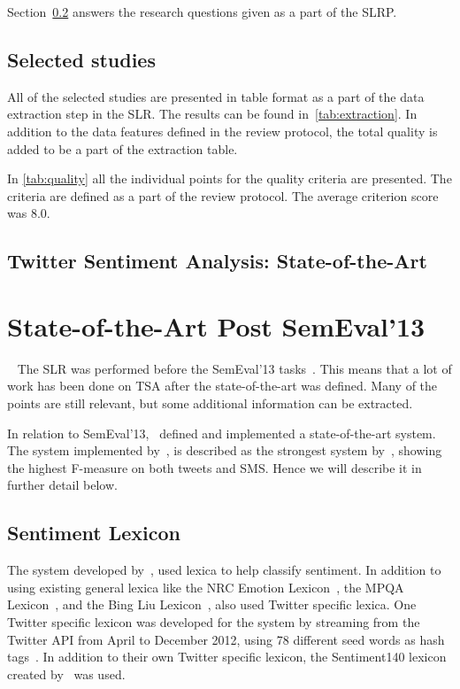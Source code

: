 Section~\ref{sec:stateofart} answers the research questions given as a part of the SLRP. 

\subsection{Selected studies} 
\label{sec:selected}

All of the selected studies are presented in table format as a part of the data extraction step in the SLR. The results can be found in~\autoref{tab:extraction}. In addition to the data features defined in the review protocol, the total quality is added to be a part of the extraction table.



In \autoref{tab:quality} all the individual points for the quality criteria are presented. The criteria are defined as a part of the review protocol. The average criterion score was 8.0.



\subsection{Twitter Sentiment Analysis: State-of-the-Art}
\label{sec:stateofart}


\clearpage
\section{State-of-the-Art Post SemEval'13}~\label{sec:stateofart_post}
The SLR was performed before the SemEval'13 tasks~\citep{WilsonEA:13}. This means that a lot of work has been done on TSA after the state-of-the-art was defined. Many of the points are still relevant, but some additional information can be extracted. 

In relation to SemEval'13,~\cite{MohammadEA:13} defined and implemented a state-of-the-art system. The system implemented by~\cite{MohammadEA:13}, is described as the strongest system by~\cite{WilsonEA:13}, showing the highest F-measure on both tweets and SMS. Hence we will describe it in further detail below.

\subsection{Sentiment Lexicon}
The system developed by~\cite{MohammadEA:13}, used lexica to help classify sentiment. In addition to using existing general lexica like the NRC Emotion Lexicon~\citep{mohammad2010emotions, mohammad2011tracking}, the MPQA Lexicon~\citep{wilson2005recognizing}, and the Bing Liu Lexicon~\citep{hu2004mining}, \cite{MohammadEA:13} also used Twitter specific lexica. One Twitter specific lexicon was developed for the system by streaming from the Twitter API from April to December 2012, using 78 different seed words as hash tags~\citep{MohammadEA:13}. In addition to their own Twitter specific lexicon, the Sentiment140 lexicon created by~\cite{article:go} was used.

